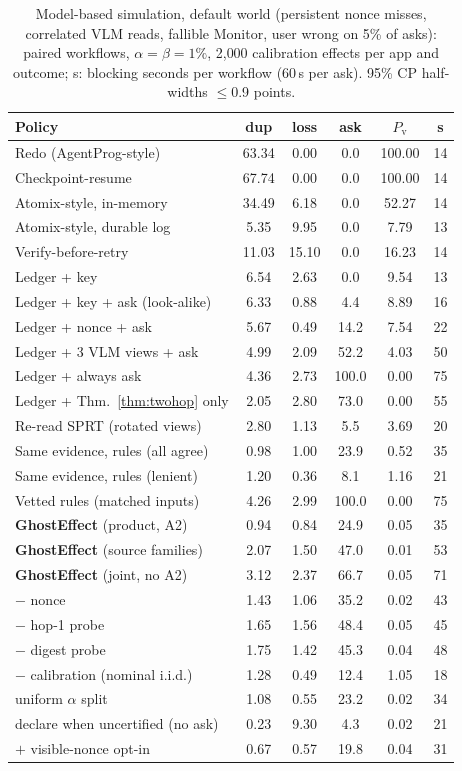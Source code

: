 \begin{table}[t]
\centering
\caption{Model-based simulation, default world (persistent nonce misses, correlated VLM reads, fallible Monitor, user wrong on 5\% of asks): \SimN{} paired workflows, $\alpha{=}\beta{=}1\%$, 2{,}000 calibration effects per app and outcome; s: blocking seconds per workflow (60\,s per ask). 95\% CP half-widths $\le$0.9 points.}
\label{tab:planner-extended}
\footnotesize
\setlength{\tabcolsep}{2.2pt}
\begin{tabular}{@{}l ccccc@{}}
\toprule
Policy & dup & loss & ask & $P_{\mathrm{v}}$ & s \\
\midrule
Redo (AgentProg-style) & 63.34 & 0.00 & 0.0 & 100.00 & 14 \\
Checkpoint-resume & 67.74 & 0.00 & 0.0 & 100.00 & 14 \\
Atomix-style, in-memory & 34.49 & 6.18 & 0.0 & 52.27 & 14 \\
Atomix-style, durable log & 5.35 & 9.95 & 0.0 & 7.79 & 13 \\
Verify-before-retry & 11.03 & 15.10 & 0.0 & 16.23 & 14 \\
Ledger + key & 6.54 & 2.63 & 0.0 & 9.54 & 13 \\
Ledger + key + ask (look-alike) & 6.33 & 0.88 & 4.4 & 8.89 & 16 \\
Ledger + nonce + ask & 5.67 & 0.49 & 14.2 & 7.54 & 22 \\
Ledger + 3 VLM views + ask & 4.99 & 2.09 & 52.2 & 4.03 & 50 \\
Ledger + always ask & 4.36 & 2.73 & 100.0 & 0.00 & 75 \\
Ledger + Thm.~\ref{thm:twohop} only & 2.05 & 2.80 & 73.0 & 0.00 & 55 \\
Re-read SPRT (rotated views) & 2.80 & 1.13 & 5.5 & 3.69 & 20 \\
\midrule
Same evidence, rules (all agree) & 0.98 & 1.00 & 23.9 & 0.52 & 35 \\
Same evidence, rules (lenient) & 1.20 & 0.36 & 8.1 & 1.16 & 21 \\
Vetted rules (matched inputs) & 4.26 & 2.99 & 100.0 & 0.00 & 75 \\
\textbf{GhostEffect} (product, A2) & 0.94 & 0.84 & 24.9 & 0.05 & 35 \\
\textbf{GhostEffect} (source families) & 2.07 & 1.50 & 47.0 & 0.01 & 53 \\
\textbf{GhostEffect} (joint, no A2) & 3.12 & 2.37 & 66.7 & 0.05 & 71 \\
\midrule
\quad $-$ nonce & 1.43 & 1.06 & 35.2 & 0.02 & 43 \\
\quad $-$ hop-1 probe & 1.65 & 1.56 & 48.4 & 0.05 & 45 \\
\quad $-$ digest probe & 1.75 & 1.42 & 45.3 & 0.04 & 48 \\
\quad $-$ calibration (nominal i.i.d.) & 1.28 & 0.49 & 12.4 & 1.05 & 18 \\
\quad uniform $\alpha$ split & 1.08 & 0.55 & 23.2 & 0.02 & 34 \\
\quad declare when uncertified (no ask) & 0.23 & 9.30 & 4.3 & 0.02 & 21 \\
\quad $+$ visible-nonce opt-in & 0.67 & 0.57 & 19.8 & 0.04 & 31 \\
\bottomrule
\end{tabular}
\end{table}
